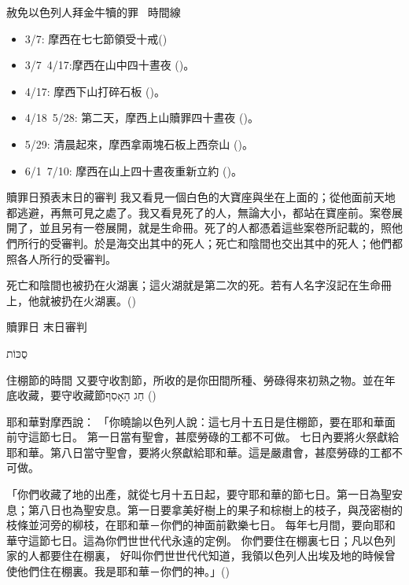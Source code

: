 \documentclass{beamer}
\newcommand{\topic}[1]{
  \begin{frame}
    \centering
    \vspace*{1cm}
    {\fontsize{40}{48}\selectfont #1\par}
    \vfill
  \end{frame}
}
\newcommand{\conclusion}[2]{
  \begin{frame}
    \centering
    \vspace*{1cm}
    {\fontsize{40}{48}\selectfont #1 \textemdash #2\par}
    \vfill
  \end{frame}
}
\newcommand{\parvspace}{\par\vspace{0.5em}}
\begin{document}
\begin{frame}{赦免以色列人拜金牛犢的罪 \textendash\ 時間線}
  \begin{itemize}
    \item 3/7: 摩西在七七節領受十戒()\parencite{TenCommandmentsOnShavuot}
    \item 3/7\textendash\ 4/17:摩西在山中\alert{四十晝夜} ()。
    \item 4/17: 摩西下山打碎石板 ()。
    \item 4/18\textendash\ 5/28: 第二天，摩西上山贖罪\alert{四十晝夜} ()。
    \item 5/29: 清晨起來，摩西拿兩塊石板上西奈山 ()。
    \item 6/1\textendash\ \alert{7/10}: 摩西在山上\alert{四十晝夜}重新立約
      ()。
  \end{itemize}
\end{frame}

\begin{frame}{贖罪日預表末日的審判}
  我又看見一個白色的大寶座與坐在上面的；從他面前天地都逃避，再無可見之處了。我又看見死了的人，無論大小，都站在寶座前。案卷展開了，並且另有一卷展開，就是生命冊。\alert{死了的人都憑着這些案卷所記載的，照他們所行的受審判}。於是海交出其中的死人；死亡和陰間也交出其中的死人；他們都照各人所行的受審判。\parvspace
  死亡和陰間也被扔在火湖裏；這火湖就是第二次的死。\alert{若有人名字沒記在生命冊上，他就被扔在火湖裏}。()\parvspace
\end{frame}

\conclusion{贖罪日}{末日審判}

\topic{\texthebrew{סֻכּוֹת}}

\begin{frame}{住棚節的時間}
  又要守收割節，所收的是你田間所種、勞碌得來初熟之物。並在年底收藏，要守\alert{收藏節\texthebrew{חַג
  הָאָסִף}} ()\parvspace
  耶和華對摩西說： 「你曉諭以色列人說：這\alert{七月十五日是住棚節，要在耶和華面前守這節七日}。
  第一日當有聖會，甚麼勞碌的工都不可做。
  七日內要將火祭獻給耶和華。\alert{第八日當守聖會}，要將火祭獻給耶和華。這是嚴肅會，甚麼勞碌的工都不可做。\parvspace
  \textellipsis{}\parvspace
  「你們收藏了地的出產，就\alert{從七月十五日起，要守耶和華的節七日。第一日為聖安息；第八日也為聖安息}。第一日要拿美好樹上的果子和棕樹上的枝子，與茂密樹的枝條並河旁的柳枝，在耶和華－你們的神面前歡樂七日。
  每年七月間，要向耶和華守這節七日。這為你們世世代代永遠的定例。 \alert{你們要住在棚裏七日；凡以色列家的人都要住在棚裏，
  好叫你們世世代代知道，我領以色列人出埃及地的時候曾使他們住在棚裏。我是耶和華－你們的神}。」()\parvspace
\end{frame}
\end{document}
